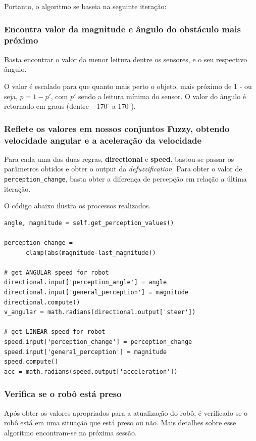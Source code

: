 \documentclass[twoside,conference,a4paper]{IEEEtran}
\begin{document}
Portanto, o algoritmo se baseia na seguinte iteração: \\

  \subsubsection{Encontra valor da magnitude e ângulo do obstáculo mais próximo}
    Basta encontrar o valor da menor leitura dentre os sensores, e o seu respectivo ângulo. 

    O valor é escalado para que quanto mais perto o objeto, mais próximo de 1 - ou seja, $p = 1-p'$, com $p'$ sendo a leitura mínima do sensor. O valor do ângulo é retornado em graus (dentre $-170^{\circ}$ a $170^{\circ}$). \\

  \subsubsection{Reflete os valores em nossos conjuntos Fuzzy, obtendo velocidade angular e a aceleração da velocidade}
    Para cada uma das duas regras, \textbf{directional} e \textbf{speed}, bastou-se passar os parâmetros obtidos e obter o output da \textit{defuzzification}. Para obter o valor de \texttt{perception\_change}, basta obter a diferença de percepção em relação a última iteração. 

    O código abaixo ilustra os processos realizados. \newpage

    \begin{lstlisting}[caption={Aplicação dos conjuntos fuzzy}]
angle, magnitude = self.get_perception_values()

perception_change = 
      clamp(abs(magnitude-last_magnitude))

# get ANGULAR speed for robot
directional.input['perception_angle'] = angle
directional.input['general_perception'] = magnitude
directional.compute()
v_angular = math.radians(directional.output['steer'])

# get LINEAR speed for robot
speed.input['perception_change'] = perception_change
speed.input['general_perception'] = magnitude
speed.compute()
acc = math.radians(speed.output['acceleration'])
    \end{lstlisting}

  \subsubsection{Verifica se o robô está preso}
    Após obter os valores apropriados para a atualização do robô, é verificado se o robô está em uma situação que está preso ou não. Mais detalhes sobre esse algoritmo encontram-se na próxima sessão.
\end{document}
